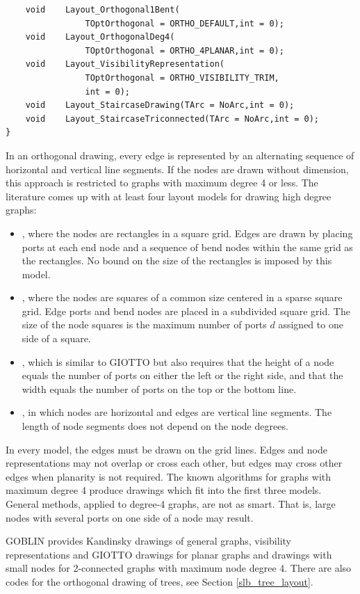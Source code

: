 \documentclass[a4paper,11pt,twoside]{book}
\begin{document}
\begin{multicols}{2}
\begin{mymethods}
\begin{verbatim}
    void    Layout_Orthogonal1Bent(
                TOptOrthogonal = ORTHO_DEFAULT,int = 0);
    void    Layout_OrthogonalDeg4(
                TOptOrthogonal = ORTHO_4PLANAR,int = 0);
    void    Layout_VisibilityRepresentation(
                TOptOrthogonal = ORTHO_VISIBILITY_TRIM,
                int = 0);
    void    Layout_StaircaseDrawing(TArc = NoArc,int = 0);
    void    Layout_StaircaseTriconnected(TArc = NoArc,int = 0);
}
\end{verbatim}
\end{mymethods}
In an orthogonal drawing, every edge is represented by an alternating sequence
of horizontal and vertical line segments. If the nodes are drawn without
dimension, this approach is restricted to graphs with maximum degree 4 or less.
The literature comes up with at least four layout models for drawing high
degree graphs:
\begin{itemize}
\item {}, where the nodes are rectangles in a square grid. Edges are drawn
    by placing ports at each end node and a sequence of bend nodes within the
    same grid as the rectangles. No bound on the size of the rectangles is
    imposed by this model.
\item {}, where the nodes are squares of a common size centered in a
    sparse square grid. Edge ports and bend nodes are placed in a subdivided
    square grid. The size of the node squares is the maximum number of ports
    $d$ assigned to one side of a square.
\item {}, which is similar to GIOTTO but also requires
    that the height of a node equals the number of ports on either the left or
    the right side, and that the width equals the number of ports on the top or
    the bottom line.
\item {}, in which nodes are horizontal and edges
    are vertical line segments. The length of node segments does not depend
    on the node degrees.
\end{itemize}
In every model, the edges must be drawn on the grid lines. Edges and node
representations may not overlap or cross each other, but edges may cross other
edges when planarity is not required. The known algorithms for graphs with
maximum degree 4 produce drawings which fit into the first three models.
General methods, applied to degree-4 graphs, are not as smart. That is, large
nodes with several ports on one side of a node may result.

GOBLIN provides Kandinsky drawings of general graphs, visibility representations
and GIOTTO drawings for planar graphs and drawings with small nodes for
2-connected graphs with maximum node degree 4. There are also codes for the
orthogonal drawing of trees, see Section \ref{slb_tree_layout}.


\end{multicols}
\end{document}
